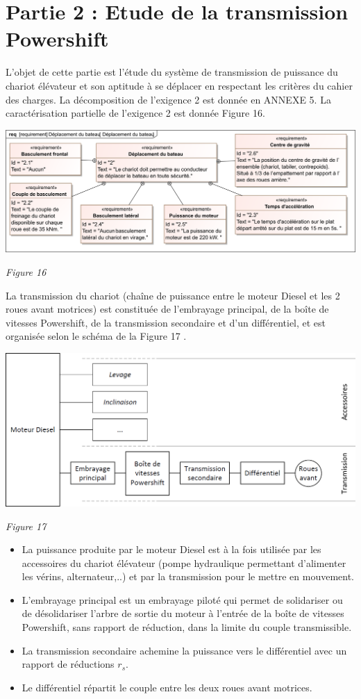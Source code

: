 \documentclass[10pt,fleqn]{article} %
\begin{document}
\section{Partie 2 : Etude de la transmission Powershift}
L’objet de cette partie est l’étude du système de transmission de puissance du chariot élévateur et son aptitude à se déplacer en respectant les critères du cahier des charges.
La décomposition de l'exigence 2 est donnée en ANNEXE 5. La caractérisation partielle de l'exigence 2 est donnée Figure 16.

\begin{center}
\includegraphics[width=1.\linewidth]{images/fig_16}

\textit{Figure 16}
\end{center}


La transmission du chariot (chaîne de puissance entre le moteur Diesel et les 2 roues avant motrices) est constituée de l’embrayage principal, de la boîte de vitesses Powershift, de la transmission secondaire et d’un différentiel, et est organisée selon le schéma de la Figure 17 .

\begin{center}
\includegraphics[width=.8\linewidth]{images/fig_17}

\textit{Figure 17}
\end{center}

\begin{itemize}
\item La puissance produite par le moteur Diesel est à la fois utilisée par les accessoires du chariot élévateur (pompe hydraulique permettant d’alimenter les vérins, alternateur,..) et par la transmission pour le mettre en mouvement.
\item  L’embrayage principal est un embrayage piloté qui permet de solidariser ou de désolidariser l’arbre de sortie du moteur à l’entrée de la boîte de vitesses Powershift, sans rapport de réduction, dans la limite du couple transmissible.
\item  La transmission secondaire achemine la puissance vers le différentiel avec un rapport de réductions $r_s$.
\item  Le différentiel répartit le couple entre les deux roues avant motrices.
\end{itemize}
\end{document}
